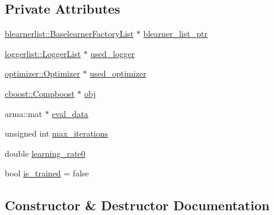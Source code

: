 \subsection*{Private Attributes}
\begin{DoxyCompactItemize}
\item 
\mbox{\hyperlink{classblearnerlist_1_1_baselearner_factory_list}{blearnerlist\+::\+Baselearner\+Factory\+List}} $\ast$ \mbox{\hyperlink{class_compboost_wrapper_a5d1fea41a647ecda26106d7fb29b63eb}{blearner\+\_\+list\+\_\+ptr}}
\item 
\mbox{\hyperlink{classloggerlist_1_1_logger_list}{loggerlist\+::\+Logger\+List}} $\ast$ \mbox{\hyperlink{class_compboost_wrapper_afb5bff8581d3b9d9f8c0665a5ef5c028}{used\+\_\+logger}}
\item 
\mbox{\hyperlink{classoptimizer_1_1_optimizer}{optimizer\+::\+Optimizer}} $\ast$ \mbox{\hyperlink{class_compboost_wrapper_a14f682d0b5d9260ee1c84d09e5c26a9c}{used\+\_\+optimizer}}
\item 
\mbox{\hyperlink{classcboost_1_1_compboost}{cboost\+::\+Compboost}} $\ast$ \mbox{\hyperlink{class_compboost_wrapper_aa8050a2356bd99b89f829b0eabdf975c}{obj}}
\item 
arma\+::mat $\ast$ \mbox{\hyperlink{class_compboost_wrapper_a9581fc7a3abefc5c9ea8bfb1409d0a8e}{eval\+\_\+data}}
\item 
unsigned int \mbox{\hyperlink{class_compboost_wrapper_a0397461c76388504cb2c8a490665f80d}{max\+\_\+iterations}}
\item 
double \mbox{\hyperlink{class_compboost_wrapper_a5825622aed0ce483d9e9493b772dcc00}{learning\+\_\+rate0}}
\item 
bool \mbox{\hyperlink{class_compboost_wrapper_a940c9eed2a807978894f98a7eac0d5e2}{is\+\_\+trained}} = false
\end{DoxyCompactItemize}


\subsection{Constructor \& Destructor Documentation}
\mbox{\label{class_compboost_wrapper_a5c2f3c21c22aea08b042d91072f43707}} 

